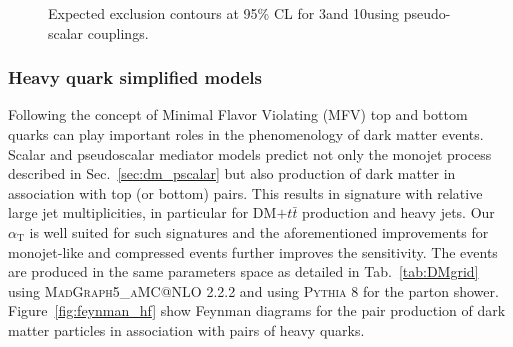 \begin{figure}[h!]
  \centering
  \caption{\label{fig:limits_P} Expected exclusion contours at 95\% CL for 3\fbinv and 10\fbinv using pseudo-scalar couplings. }
\end{figure}


\clearpage
\subsubsection{Heavy quark simplified models}

Following the concept of Minimal Flavor Violating (MFV) top and bottom quarks can play important roles in the phenomenology of dark matter events.
Scalar and pseudoscalar mediator models predict not only the monojet process described in Sec.~\ref{sec:dm_pscalar} but also production of dark matter in association
with top (or bottom) pairs. This results in signature with relative large jet multiplicities, in particular for DM$+t\bar{t}$ production and heavy jets. Our $\alpha_{\textrm{T}}$ is well suited for such signatures and the aforementioned improvements for monojet-like and compressed events further improves the sensitivity. The events are produced in the same parameters space as detailed in Tab.~\ref{tab:DMgrid} using \textsc{MadGraph5\_aMC@NLO} 2.2.2 and using \textsc{Pythia 8} for the parton shower. Figure~\ref{fig:feynman_hf} show Feynman diagrams for the pair production of dark matter particles in association with pairs of heavy quarks.


